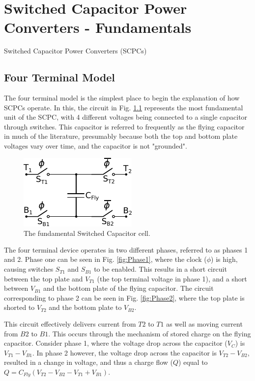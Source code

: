 \chapter{Switched Capacitor Power Converters - Fundamentals}
Switched Capacitor Power Converters (SCPCs)
	\section{Four Terminal Model}
	The four terminal model is the simplest place to begin the explanation of how SCPCs operate. In this, the circuit in Fig. \ref{fig:sccell1} represents the most fundamental unit of the SCPC, with 4 different voltages being connected to a single capacitor through switches. This capacitor is referred to frequently as the flying capacitor in much of the literature, presumably because both the top and bottom plate voltages vary over time, and the capacitor is not "grounded". 
	
\begin{figure}
	\centering
	\includegraphics[width=0.4\linewidth]{4Terminal/Figures/SCCell_1.pdf}
	\caption{The fundamental Switched Capacitor cell.}
	\label{fig:sccell1}
\end{figure}
	
	The four terminal device operates in two different phases, referred to as phases 1 and 2. Phase one can be seen in Fig. \ref{fig:Phase1}, where the clock ($\phi$) is high, causing switches $S_{T1}$ and $S_{B1}$ to be enabled. This results in a short circuit between the top plate and $V_{T1}$ (the top terminal voltage in phase 1), and a short between $V_{B1}$ and the bottom plate of the flying capacitor. The circuit corresponding to phase 2 can be seen in Fig. \ref{fig:Phase2}, where the top plate is shorted to $V_{T2}$ and the bottom plate to $V_{B2}$.
	
	This circuit effectively delivers current from ${T2}$ to ${T1}$ as well as moving current from ${B2}$ to ${B1}$. This occurs through the mechanism of stored charge on the flying capacitor. Consider phase 1, where the voltage drop across the capacitor ($V_{C}$) is $V_{T1} - V_{B1}$. In phase 2 however, the voltage drop across the capacitor is $V_{T2} - V_{B2}$, resulted in a change in voltage, and thus a charge flow ($Q$) equal to $Q = C_{Fly}(V_{T2} - V_{B2} - V_{T1} + V_{B1})$.
	
